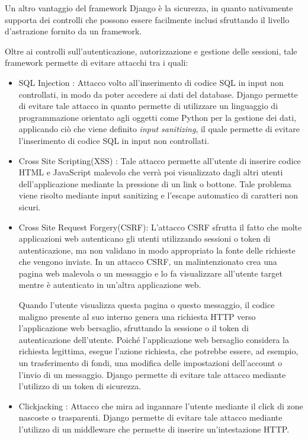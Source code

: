 Un altro vantaggio del framework Django è la sicurezza, in quanto nativamente supporta dei controlli che possono essere facilmente inclusi sfruttando il livello d'astrazione fornito da un framework. \cite{django_security}

Oltre ai controlli sull'autenticazione, autorizzazione e gestione delle sessioni, tale framework permette di evitare attacchi tra i quali:
\begin{itemize}
    \item SQL Injection : Attacco volto all'inserimento di codice SQL in input non controllati, in modo da poter accedere ai dati del database. Django permette di evitare tale attacco in quanto permette di utilizzare un linguaggio di programmazione orientato agli oggetti come Python per la gestione dei dati, applicando ciò che viene definito \textit{input sanitizing}, il quale permette di evitare l'inserimento di codice SQL in input non controllati.
    \item Cross Site Scripting(XSS) : Tale attacco permette all'utente di inserire codice HTML e JavaScript malevolo che verrà poi visualizzato dagli altri utenti dell'applicazione mediante la pressione di un link o bottone. Tale problema viene risolto mediante input sanitizing e l'escape automatico di caratteri non sicuri.
    \item Cross Site Request Forgery(CSRF): L'attacco CSRF sfrutta il fatto che molte applicazioni web autenticano gli utenti utilizzando sessioni o token di autenticazione, ma non validano in modo appropriato la fonte delle richieste che vengono inviate. In un attacco CSRF, un malintenzionato crea una pagina web malevola o un messaggio e lo fa visualizzare all'utente target mentre è autenticato in un'altra applicazione web.

Quando l'utente visualizza questa pagina o questo messaggio, il codice maligno presente al suo interno genera una richiesta HTTP verso l'applicazione web bersaglio, sfruttando la sessione o il token di autenticazione dell'utente. Poiché l'applicazione web bersaglio considera la richiesta legittima, esegue l'azione richiesta, che potrebbe essere, ad esempio, un trasferimento di fondi, una modifica delle impostazioni dell'account o l'invio di un messaggio. Django permette di evitare tale attacco mediante l'utilizzo di un token di sicurezza.

    \item Clickjacking : Attacco che mira ad ingannare l'utente mediante il click di zone nascoste o trasparenti. Django permette di evitare tale attacco mediante l'utilizzo di un middleware che permette di inserire un'intestazione HTTP.

\end{itemize}

